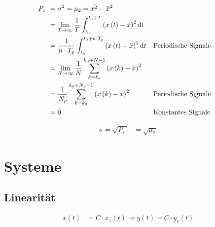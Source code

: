 \begin{boxleft}
\\
\\
\end{boxleft}\begin{boxrightshaded}
\begin{align*}
P_{x~}&=\sigma^2=\mu_2=\bar{x^2}-\bar{x}^2\\
&=\lim_{T\to\infty}\frac{1}{T}\int_{t_0}^{t_0+T}\left(x\left(t\right)-\bar{x}\right)^2\mathop{}\!\mathrm{d} t\\
&=\frac{1}{n\cdot T_p}\int_{t_0}^{t_0+n\cdot T_p}\left(x\left(t\right)-\bar{x}\right)^2\mathop{}\!\mathrm{d} t&&\text{Periodische Signale}\\
&=\lim_{N\to\infty}\frac{1}{N}\sum_{k=k_0}^{k_0+N-1}\left(x\left(k\right)-\bar{x}\right)^2\\
&=\frac{1}{N_p}\sum_{k=k_0}^{k_0+N_p-1}\left(x\left(k\right)-\bar{x}\right)^2&&\text{Periodische Signale}\\
&=0&&\text{Konstantes Signale}
\end{align*}
\end{boxrightshaded}

\begin{boxleft}
\end{boxleft}\begin{boxrightshaded}
\begin{align*}
\sigma=\sqrt{P_{x~}}&=\sqrt{\mu_2}
\end{align*}
\end{boxrightshaded}


\section{Systeme}

\subsection{Linearität}

\begin{boxleft}
\end{boxleft}\begin{boxrightshaded}
\begin{align*}
x\left(t\right)&=C\cdot x_1\left(t\right)\Rightarrow y\left(t\right)=C\cdot y_1\left(t\right)
\end{align*}
\end{boxrightshaded}

